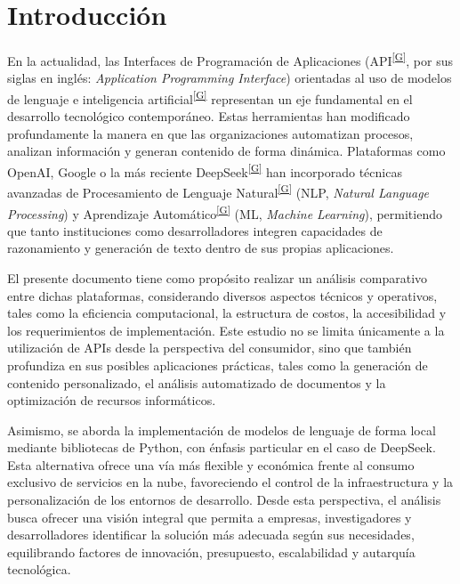 \documentclass[12pt,a4paper]{report}
\numberwithin{figure}{section}
\begin{document}
\newpage

\chapter{Introducción}
\label{ch:introduccion}

En la actualidad, las Interfaces de Programación de Aplicaciones (API\textsuperscript{\hyperref[glos:api]{[G]}}, por sus siglas en inglés: \textit{Application Programming Interface}) orientadas al uso de modelos de lenguaje e inteligencia artificial\textsuperscript{\hyperref[glos:ia]{[G]}} representan un eje fundamental en el desarrollo tecnológico contemporáneo. Estas herramientas han modificado profundamente la manera en que las organizaciones automatizan procesos, analizan información y generan contenido de forma dinámica. Plataformas como OpenAI, Google o la más reciente DeepSeek\textsuperscript{\hyperref[glos:deepseek]{[G]}} han incorporado técnicas avanzadas de Procesamiento de Lenguaje Natural\textsuperscript{\hyperref[glos:pln]{[G]}} (NLP, \textit{Natural Language Processing}) y Aprendizaje Automático\textsuperscript{\hyperref[glos:ml]{[G]}} (ML, \textit{Machine Learning}), permitiendo que tanto instituciones como desarrolladores integren capacidades de razonamiento y generación de texto dentro de sus propias aplicaciones.

El presente documento tiene como propósito realizar un análisis comparativo entre dichas plataformas, considerando diversos aspectos técnicos y operativos, tales como la eficiencia computacional, la estructura de costos, la accesibilidad y los requerimientos de implementación. Este estudio no se limita únicamente a la utilización de APIs desde la perspectiva del consumidor, sino que también profundiza en sus posibles aplicaciones prácticas, tales como la generación de contenido personalizado, el análisis automatizado de documentos y la optimización de recursos informáticos.

Asimismo, se aborda la implementación de modelos de lenguaje de forma local mediante bibliotecas de Python, con énfasis particular en el caso de DeepSeek. Esta alternativa ofrece una vía más flexible y económica frente al consumo exclusivo de servicios en la nube, favoreciendo el control de la infraestructura y la personalización de los entornos de desarrollo. Desde esta perspectiva, el análisis busca ofrecer una visión integral que permita a empresas, investigadores y desarrolladores identificar la solución más adecuada según sus necesidades, equilibrando factores de innovación, presupuesto, escalabilidad y autarquía tecnológica.
\end{document}
